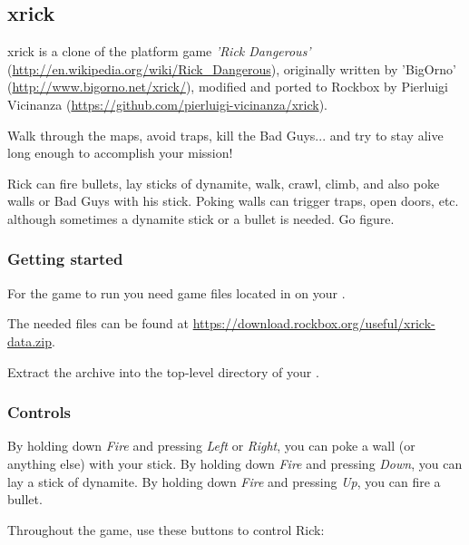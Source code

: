 \subsection{xrick}
xrick is a clone of the platform game
\emph{'Rick Dangerous'}
(\url{http://en.wikipedia.org/wiki/Rick_Dangerous}),
originally written by 'BigOrno'
(\url{http://www.bigorno.net/xrick/}),
modified and ported to Rockbox by Pierluigi Vicinanza
(\url{https://github.com/pierluigi-vicinanza/xrick}).

Walk through the maps, avoid traps, kill the Bad Guys... and
try to stay alive long enough to accomplish your mission!

Rick can fire bullets, lay sticks of dynamite, walk, crawl,
climb, and also poke walls or Bad Guys with his stick.
Poking walls can trigger traps, open doors, etc. although
sometimes a dynamite stick or a bullet is needed.
Go figure.

\subsubsection{Getting started}
For the game to run you need  game files located in
 on your \dap.

The needed files can be found at
\url{https://download.rockbox.org/useful/xrick-data.zip}.

Extract the  archive into the top-level directory of your \dap.

\subsubsection{Controls}
By holding down \emph{Fire} and pressing \emph{Left} or \emph{Right},
you can poke a wall (or anything else) with your stick.
By holding down \emph{Fire} and pressing \emph{Down}, you can lay a stick of dynamite.
By holding down \emph{Fire} and pressing \emph{Up}, you can fire a bullet.

Throughout the game, use these buttons to control Rick:

